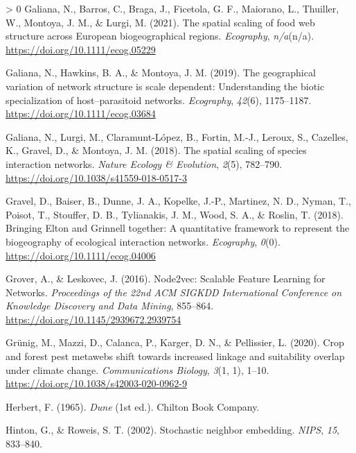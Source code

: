 \documentclass[10pt,oneside]{article}
\newlength{\cslhangindent}
\newenvironment{CSLReferences}[3] %
 {%
  \setlength{\parindent}{0pt}
  \ifodd #1 \everypar{\setlength{\hangindent}{\cslhangindent}}\ignorespaces\fi
  \ifnum #2 > 0
  \setlength{\parskip}{#2\baselineskip}
  \fi
 }%
 {}
\begin{document}
\begin{CSLReferences}{1}{0}
\leavevmode\hypertarget{ref-Galiana2021SpaSca}{}%
Galiana, N., Barros, C., Braga, J., Ficetola, G. F., Maiorano, L.,
Thuiller, W., Montoya, J. M., \& Lurgi, M. (2021). The spatial scaling
of food web structure across European biogeographical regions.
\emph{Ecography}, \emph{n/a}(n/a).
\url{https://doi.org/10.1111/ecog.05229}

\leavevmode\hypertarget{ref-Galiana2019GeoVar}{}%
Galiana, N., Hawkins, B. A., \& Montoya, J. M. (2019). The geographical
variation of network structure is scale dependent: Understanding the
biotic specialization of host--parasitoid networks. \emph{Ecography},
\emph{42}(6), 1175--1187. \url{https://doi.org/10.1111/ecog.03684}

\leavevmode\hypertarget{ref-Galiana2018SpaSca}{}%
Galiana, N., Lurgi, M., Claramunt-López, B., Fortin, M.-J., Leroux, S.,
Cazelles, K., Gravel, D., \& Montoya, J. M. (2018). The spatial scaling
of species interaction networks. \emph{Nature Ecology \& Evolution},
\emph{2}(5), 782--790. \url{https://doi.org/10.1038/s41559-018-0517-3}

\leavevmode\hypertarget{ref-Gravel2018BriElt}{}%
Gravel, D., Baiser, B., Dunne, J. A., Kopelke, J.-P., Martinez, N. D.,
Nyman, T., Poisot, T., Stouffer, D. B., Tylianakis, J. M., Wood, S. A.,
\& Roslin, T. (2018). Bringing Elton and Grinnell together: A
quantitative framework to represent the biogeography of ecological
interaction networks. \emph{Ecography}, \emph{0}(0).
\url{https://doi.org/10.1111/ecog.04006}

\leavevmode\hypertarget{ref-Grover2016NodSca}{}%
Grover, A., \& Leskovec, J. (2016). Node2vec: Scalable Feature Learning
for Networks. \emph{Proceedings of the 22nd ACM SIGKDD International
Conference on Knowledge Discovery and Data Mining}, 855--864.
\url{https://doi.org/10.1145/2939672.2939754}

\leavevmode\hypertarget{ref-Grunig2020CroFor}{}%
Grünig, M., Mazzi, D., Calanca, P., Karger, D. N., \& Pellissier, L.
(2020). Crop and forest pest metawebs shift towards increased linkage
and suitability overlap under climate change. \emph{Communications
Biology}, \emph{3}(1, 1), 1--10.
\url{https://doi.org/10.1038/s42003-020-0962-9}

\leavevmode\hypertarget{ref-Herbert1965Dun}{}%
Herbert, F. (1965). \emph{Dune} (1st ed.). Chilton Book Company.

\leavevmode\hypertarget{ref-Hinton2002StoNei}{}%
Hinton, G., \& Roweis, S. T. (2002). Stochastic neighbor embedding.
\emph{NIPS}, \emph{15}, 833--840.


\end{CSLReferences}
\end{document}
